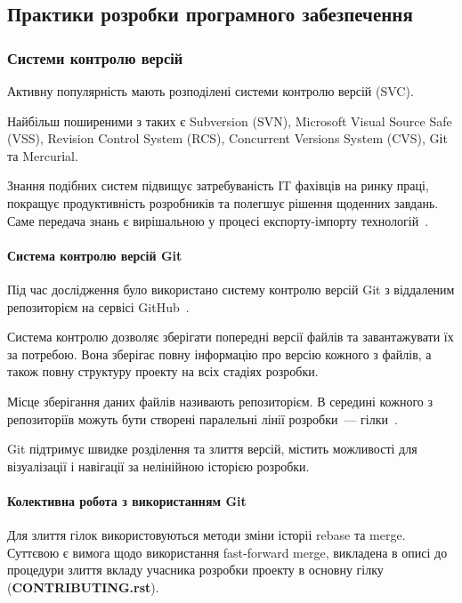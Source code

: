 \subsection{Практики розробки програмного забезпечення}

\subsubsection{Системи контролю версій}
Активну популярність мають розподілені системи контролю версій (SVC).

Найбільш поширеними з таких є Subversion (SVN), Microsoft Visual Source Safe (VSS), Revision Control System (RCS), Concurrent Versions System (CVS), Gіt та Mercurіal.

Знання подібних систем підвищує затребуваність ІT фахівців на ринку праці, покращує продуктивність розробників та полегшує рішення щоденних завдань. Саме передача знань є вирішальною у процесі експорту-імпорту технологій~\cite{киричек2012модель}.

\paragraph{Система контролю версій Git}

Під час дослідження було використано систему контролю версій Git з віддаленим репозиторієм на сервісі GitHub~\cite{githubKSU}.

Система контролю дозволяє зберігати попередні версії файлів та завантажувати їх за потребою. Вона зберігає повну інформацію про версію кожного з файлів, а також повну структуру проекту на всіх стадіях розробки. 

Місце зберігання даних файлів називають репозиторієм. В середині кожного з репозиторіїв можуть бути створені паралельні лінії розробки~--- гілки~\cite{loeliger2012version}.

Git підтримує швидке розділення та злиття версій, містить можливості для візуалізації і навігації за нелінійною історією розробки. 


\paragraph{Колективна робота з використанням Git}
Для злиття гілок використовуються методи зміни історіі rebase та merge. Суттєвою є вимога щодо використання fast-forward merge, викладена в описі до процедури злиття вкладу учасника розробки проекту в основну гілку (\textbf{CONTRIBUTING.rst}).

